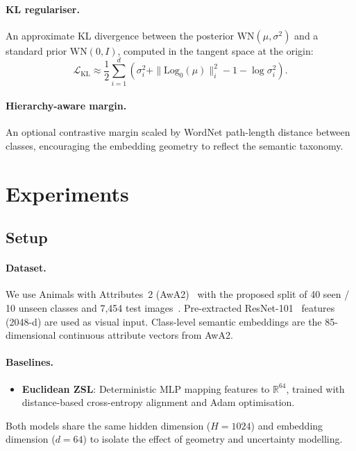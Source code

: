 \documentclass{article}
\newcommand{\R}{\mathbb{R}}
\newcommand{\WN}{\mathrm{WN}}
\newcommand{\logmap}{\mathrm{Log}}
\DeclareMathOperator{\KL}{KL}
\begin{document}
\paragraph{KL regulariser.}
An approximate KL divergence between the posterior $\WN(\mu, \sigma^2)$ and a standard prior $\WN(0, I)$, computed in the tangent space at the origin:
\begin{equation}
    \mathcal{L}_{\KL} \approx \frac{1}{2} \sum_{i=1}^{d} \left( \sigma_i^2 + \|\logmap_0(\mu)\|_i^2 - 1 - \log\sigma_i^2 \right).
\end{equation}

\paragraph{Hierarchy-aware margin.}
An optional contrastive margin scaled by WordNet path-length distance between classes, encouraging the embedding geometry to reflect the semantic taxonomy.

\section{Experiments}\label{sec:experiments}

\subsection{Setup}

\paragraph{Dataset.}
We use Animals with Attributes~2 (AwA2)~\cite{xian2018awa2} with the proposed split of 40 seen / 10 unseen classes and 7{,}454 test images~\cite{xian2019zsl}.
Pre-extracted ResNet-101~\cite{he2016resnet} features (2048-d) are used as visual input.
Class-level semantic embeddings are the 85-dimensional continuous attribute vectors from AwA2.

\paragraph{Baselines.}
\begin{itemize}
    \item \textbf{Euclidean ZSL}: Deterministic MLP mapping features to $\R^{64}$, trained with distance-based cross-entropy alignment and Adam optimisation.
\end{itemize}
Both models share the same hidden dimension ($H = 1024$) and embedding dimension ($d = 64$) to isolate the effect of geometry and uncertainty modelling.
\end{document}
